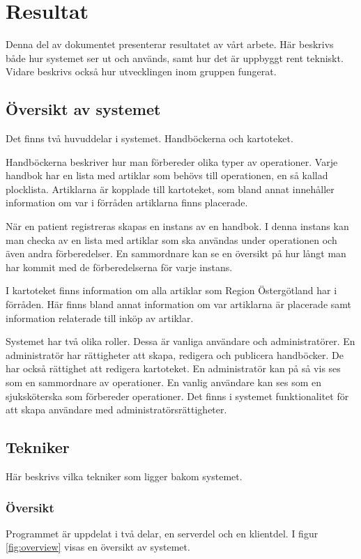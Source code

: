 \section{Resultat}
Denna del av dokumentet presenterar resultatet av vårt arbete.
Här beskrivs både hur systemet ser ut och används, samt hur det är uppbyggt rent tekniskt. Vidare beskrivs också hur utvecklingen inom gruppen fungerat.

\subsection{Översikt av systemet}
Det finns två huvuddelar i systemet. Handböckerna och kartoteket.

Handböckerna beskriver hur man förbereder olika typer av operationer.
Varje handbok har en lista med artiklar som behövs till operationen, en så kallad plocklista.
Artiklarna är kopplade till kartoteket, som bland annat innehåller information om var i förråden artiklarna finns placerade.

När en patient registreras skapas en instans av en handbok.
I denna instans kan man checka av en lista med artiklar som ska användas under operationen och även andra förberedelser.
En sammordnare kan se en översikt på hur långt man har kommit med de förberedelserna för varje instans.

I kartoteket finns information om alla artiklar som Region Östergötland har i förråden.
Här finns bland annat information om var artiklarna är placerade samt information relaterade till inköp av artiklar.

Systemet har två olika roller. Dessa är vanliga användare och administratörer. En administratör har rättigheter att skapa, redigera och publicera handböcker. De har också rättighet att redigera kartoteket. En administratör kan på så vis ses som en sammordnare av operationer. En vanlig användare kan ses som en sjuksköterska som förbereder operationer. Det finns i systemet funktionalitet för att skapa användare med administratörsrättigheter.

\subsection{Tekniker}
Här beskrivs vilka tekniker som ligger bakom systemet.

\subsubsection{Översikt}
Programmet är uppdelat i två delar, en serverdel och en klientdel. I figur \ref{fig:overview} visas en översikt av systemet.

